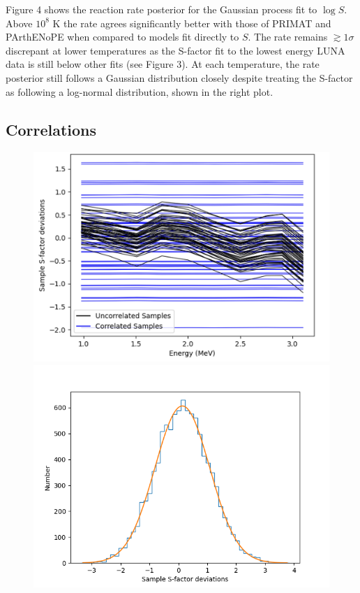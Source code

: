 \documentclass[%
 reprint,
superscriptaddress,
nofootinbib,
 amsmath,amssymb,
 aps,
 pra,
]{revtex4-2}
\begin{document}
Figure 4 shows the reaction rate posterior for the Gaussian process fit to $\log S$. Above $10^8$ K the rate agrees significantly better with those of PRIMAT and PArthENoPE when compared to models fit directly to $S$. The rate remains $\gtrsim1\sigma$ discrepant at lower temperatures as the S-factor fit to the lowest energy LUNA data is still below other fits (see Figure 3). At each temperature, the rate posterior still follows a Gaussian distribution closely despite treating the S-factor as following a log-normal distribution, shown in the right plot. 

\subsection{Correlations}

\begin{figure}
	\begin{minipage}{.48\textwidth}
        		\centering
        		\includegraphics[width=\linewidth]{Figures/ddhe3n_correlations.png}
    	\end{minipage}
    	\hspace{0mm}
    	\begin{minipage}{.48\textwidth}
        		\centering
        		\includegraphics[width=\linewidth]{Figures/ddhe3n_correlation_hist.png}

\end{minipage}
\end{figure}
\end{document}
